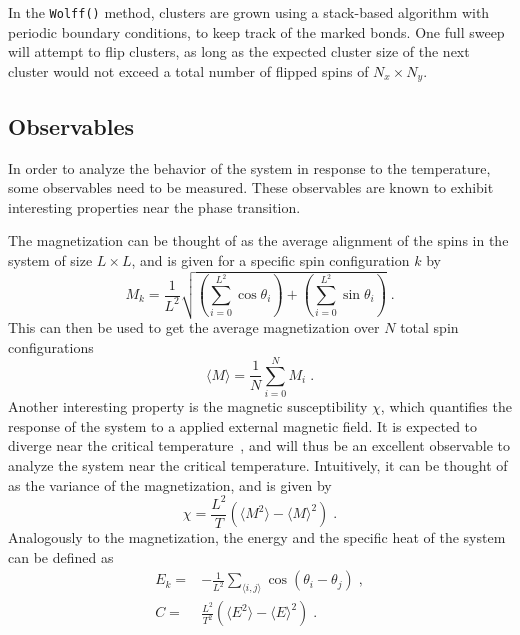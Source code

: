 In the \texttt{Wolff()} method, clusters are grown using a stack-based algorithm with periodic boundary conditions, to keep track of the marked bonds.
One full sweep will attempt to flip clusters, as long as the expected cluster size of the next cluster would not exceed a total number of flipped spins of $N_x \times N_y$.

\subsection{Observables}
In order to analyze the behavior of the system in response to the temperature, some observables need to be measured.
These observables are known to exhibit interesting properties near the phase transition.

The magnetization can be thought of as the average alignment of the spins in the system of size $L \times L$, and is given for a specific spin configuration $k$ by
$$
  M_k = \frac{1}{L^2}\sqrt{\left(\sum_{i=0}^{L^2}\cos \theta_i\right) + \left(\sum_{i=0}^{L^2}\sin \theta_i\right)} \;.
$$
This can then be used to get the average magnetization over $N$ total spin configurations
$$
  \langle M \rangle = \frac{1}{N} \sum_{i=0}^{N} M_i \;.
$$
Another interesting property is the magnetic susceptibility $\chi$, which quantifies the response of the system to a applied external magnetic field.
It is expected to diverge near the critical temperature~\cite{Kosterlitz1974}, and will thus be an excellent observable to analyze the system near the critical temperature.
Intuitively, it can be thought of as the variance of the magnetization, and is given by
$$
  \chi = \frac{L^2}{T} ( \langle M^2 \rangle - \langle M \rangle^2) \;.
$$
Analogously to the magnetization, the energy and the specific heat of the system can be defined as
\begin{align}
  E_k =& -\frac{1}{L^2} \sum_{\langle i,j \rangle} \cos(\theta_i - \theta_j) \;,\\
  C =& \frac{L^2}{T^2} ( \langle E^2 \rangle - \langle E \rangle^2) \;.
\end{align}

